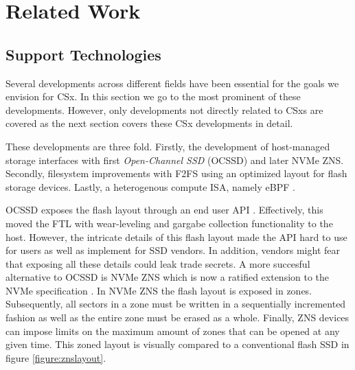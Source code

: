 
\chapter{Related Work} %



\ifpdf
    \graphicspath{{7/figures/PNG/}{7/figures/PDF/}{7/figures/}}
\else
    \graphicspath{{7/figures/EPS/}{7/figures/}}
\fi


% 

\section{Support Technologies}

Several developments across different fields have been essential for the
goals we envision for CSx. In this section we go to the most prominent of 
these developments. However, only developments not directly related to CSxs are
covered as the next section covers these CSx developments in detail.

These developments are three fold. Firstly, the development of host-managed
storage interfaces with first \textit{Open-Channel SSD} (OCSSD)
\cite{Bjrling2017LightNVMTL} and later NVMe ZNS. Secondly, filesystem
improvements with F2FS \cite{Lee2015F2FSAN} using an optimized layout for flash
storage devices. Lastly, a heterogenous compute ISA, namely eBPF
\cite{ebpf_cs_2021, kourtis2020safe, bpf-uapi}.

OCSSD exposes the flash layout through an end user API \cite{liblightnvm}.
Effectively, this moved the FTL with wear-leveling and gargabe collection
functionality to the host. However, the intricate details of this flash layout
made the API hard to use for users as well as implement for SSD vendors. In
addition, vendors might fear that exposing all these details could leak trade
secrets. A more succesful alternative to OCSSD is NVMe ZNS which is now a
ratified extension to the NVMe specification \cite{nvme-zns}. In NVMe ZNS the
flash layout is exposed in zones. Subsequently, all sectors in a zone must be
written in a sequentially incremented fashion as well as the entire zone must
be erased as a whole. Finally, ZNS devices can impose limits on the maximum
amount of zones that can be opened at any given time. This zoned layout is
visually compared to a conventional flash SSD in figure \ref{figure:znslayout}.

